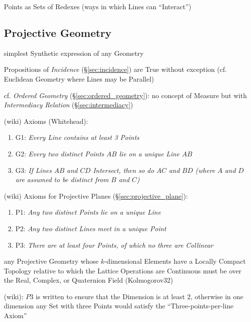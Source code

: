 Points as Sets of Redexes (ways in which Lines can ``Interact'')



\subsection{Projective Geometry}\label{sec:projective_geometry}

simplest Synthetic expression of any Geometry

Propositions of \emph{Incidence} (\S\ref{sec:incidence}) are True without
exception (cf. Euclidean Geometry where Lines may be Parallel)

\fist cf. \emph{Ordered Geometry} (\S\ref{sec:ordered_geometry}): no concept of
Measure but with \emph{Intermediacy Relation} (\S\ref{sec:intermediacy})

(wiki) Axioms (Whitehead):
\begin{enumerate}
  \item G1: \emph{Every Line contains at least 3 Points}
  \item G2: \emph{Every two distinct Points $AB$ lie on a unique Line $AB$}
  \item G3: \emph{If Lines $AB$ and $CD$ Intersect, then so do $AC$ and $BD$
    (where $A$ and $D$ are assumed to be distinct from $B$ and $C$)}
\end{enumerate}

(wiki) Axioms for Projective Planes (\S\ref{sec:projective_plane}):
\begin{enumerate}
  \item P1: \emph{Any two distinct Points lie on a unique Line}
  \item P2: \emph{Any two distinct Lines meet in a unique Point}
  \item P3: \emph{There are at least four Points, of which no three are
    Collinear}
\end{enumerate}

any Projective Geometry whose $k$-dimensional Elements have a Locally Compact
Topology relative to which the Lattice Operations are Continuous must be over
the Real, Complex, or Quaternion Field (Kolmogorov32)

(wiki): $P3$ is written to ensure that the Dimension is at least $2$, otherwise
in one dimension any Set with three Points would satisfy the
``Three-points-per-line Axiom''

